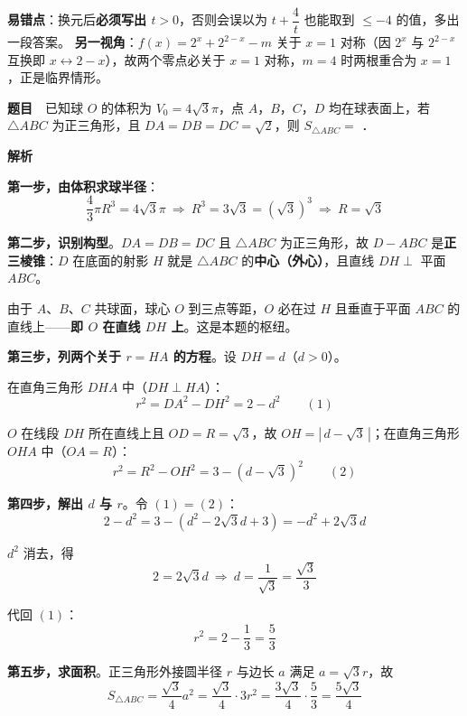 
\begin{gktip}
\textbf{易错点}：换元后\textbf{必须写出 $t>0$}，否则会误以为 $t+\dfrac4t$ 也能取到 $\le-4$ 的值，多出一段答案。
\textbf{另一视角}：$f(x)=2^x+2^{2-x}-m$ 关于 $x=1$ 对称（因 $2^x$ 与 $2^{2-x}$ 互换即 $x\leftrightarrow2-x$），故两个零点必关于 $x=1$ 对称，$m=4$ 时两根重合为 $x=1$，正是临界情形。
\end{gktip}

\par\medskip


\textbf{题目}　已知球 $O$ 的体积为 $V_0=4\sqrt{3}\pi$，点 $A$，$B$，$C$，$D$ 均在球表面上，若 $\triangle ABC$ 为正三角形，且 $DA=DB=DC=\sqrt{2}$，则 $S_{\triangle ABC}=$ \gkblank{}．

\textbf{解析}

\textbf{第一步，由体积求球半径}：
\[\frac43\pi R^3=4\sqrt3\pi\ \Longrightarrow\ R^3=3\sqrt3=\left(\sqrt3\right)^3\ \Longrightarrow\ R=\sqrt3\]

\textbf{第二步，识别构型}。$DA=DB=DC$ 且 $\triangle ABC$ 为正三角形，故 $D-ABC$ 是\textbf{正三棱锥}：$D$ 在底面的射影 $H$ 就是 $\triangle ABC$ 的\textbf{中心（外心）}，且直线 $DH\perp$ 平面 $ABC$。

由于 $A$、$B$、$C$ 共球面，球心 $O$ 到三点等距，$O$ 必在过 $H$ 且垂直于平面 $ABC$ 的直线上——\textbf{即 $O$ 在直线 $DH$ 上}。这是本题的枢纽。

\textbf{第三步，列两个关于 $r=HA$ 的方程}。设 $DH=d$（$d>0$）。

在直角三角形 $DHA$ 中（$DH\perp HA$）：
\[r^2=DA^2-DH^2=2-d^2\qquad(1)\]

$O$ 在线段 $DH$ 所在直线上且 $OD=R=\sqrt3$，故 $OH=\left|\,d-\sqrt3\,\right|$；在直角三角形 $OHA$ 中（$OA=R$）：
\[r^2=R^2-OH^2=3-\left(d-\sqrt3\right)^2\qquad(2)\]

\textbf{第四步，解出 $d$ 与 $r$}。令 $(1)=(2)$：
\[2-d^2=3-\left(d^2-2\sqrt3d+3\right)=-d^2+2\sqrt3d\]

$d^2$ 消去，得
\[2=2\sqrt3d\ \Longrightarrow\ d=\frac{1}{\sqrt3}=\frac{\sqrt3}{3}\]

代回 $(1)$：
\[r^2=2-\frac13=\frac53\]

\textbf{第五步，求面积}。正三角形外接圆半径 $r$ 与边长 $a$ 满足 $a=\sqrt3r$，故
\[S_{\triangle ABC}=\frac{\sqrt3}{4}a^2=\frac{\sqrt3}{4}\cdot3r^2=\frac{3\sqrt3}{4}\cdot\frac53=\frac{5\sqrt3}{4}\]


